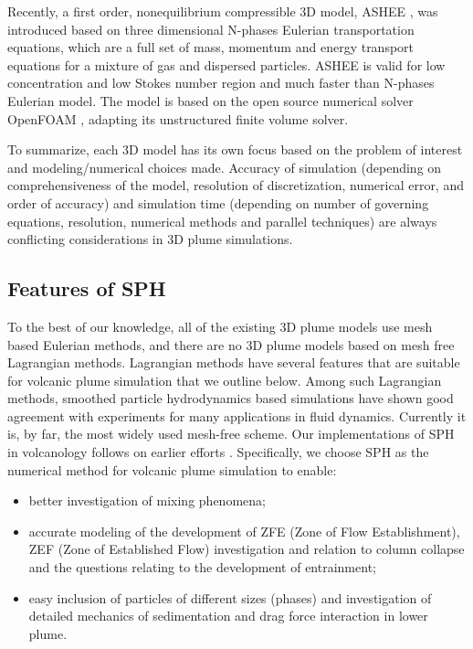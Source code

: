 \documentclass[gmd, manuscript]{copernicus}
\begin{document}
Recently, a first order, nonequilibrium compressible 3D model, ASHEE \citep{cerminara2016ashee}, was introduced based on three dimensional N-phases Eulerian transportation equations, which are a full set of mass, momentum and energy transport equations for a mixture of gas and dispersed particles. ASHEE is valid for low concentration and low Stokes number region and much faster than N-phases Eulerian model. The model is based on the open source numerical solver OpenFOAM \citep{weller1998tensorial}, adapting its unstructured finite volume solver.

To summarize, each 3D model has its own focus based on the problem of interest and modeling/numerical choices made.
 Accuracy of simulation (depending on comprehensiveness of the model, resolution of discretization, numerical error, and order of accuracy) and simulation time (depending on number of governing equations, resolution, numerical methods and parallel techniques) are always conflicting considerations in 3D plume simulations.

\subsection{Features of SPH}
To the best of our knowledge, all of the existing 3D plume models use mesh based Eulerian methods, and there are no 3D plume models based on mesh free Lagrangian methods. Lagrangian methods have several features that are suitable for volcanic plume simulation that we outline below. Among such Lagrangian methods, smoothed particle hydrodynamics \citep{gingold1977smoothed,lucy1977numerical} based simulations have shown good agreement with experiments for many applications in fluid dynamics. Currently it is, by far, the most widely used mesh-free scheme. Our implementations of SPH in volcanology follows on earlier efforts   \citep{bursik2003smoothed,herault2010sph,haddad2016smoothed}.
Specifically, we choose SPH as the numerical method for volcanic plume simulation to enable:
\begin{itemize}
\item better investigation of mixing phenomena;
\item accurate modeling of the development of ZFE (Zone of Flow Establishment), ZEF (Zone of Established Flow) investigation and relation to column collapse and the questions relating to the development of entrainment;
\item  easy inclusion of particles of different sizes (phases) and investigation of detailed mechanics of sedimentation and drag force interaction in lower plume.
\end{itemize}
\end{document}

